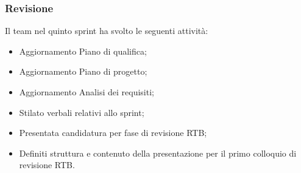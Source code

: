 \documentclass[10pt, a4paper]{article}
\begin{document}
\subsubsection{Revisione}
Il team nel quinto sprint ha svolto le seguenti attività:
\begin{itemize}
    \item Aggiornamento Piano di qualifica;
    \item Aggiornamento Piano di progetto;
    \item Aggiornamento Analisi dei requisiti;
    \item Stilato verbali relativi allo sprint;
    \item Presentata candidatura per fase di revisione RTB;
    \item Definiti struttura e contenuto della presentazione per il primo colloquio di revisione RTB.
\end{itemize}
\end{document}
